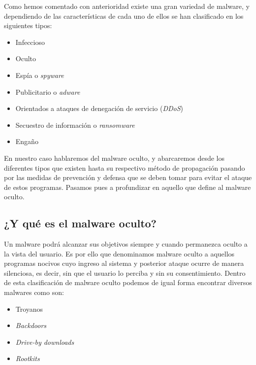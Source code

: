 \documentclass[12pt]{article}
\newcommand{\newpar} {
    \vskip 0.5cm
}
\begin{document}
        \newpar

        Como hemos comentado con anterioridad existe una gran variedad de malware, y dependiendo de las características de cada uno de ellos se han clasificado en los siguientes tipos:
        
        \begin{itemize}
            \item Infeccioso
            \item Oculto
            \item Espía o \textit{spyware}
            \item Publicitario o \textit{adware}
            \item Orientados a ataques de denegación de servicio (\textit{DDoS})
            \item Secuestro de información o \textit{ransomware}
            \item Engaño 
        \end{itemize}

        \newpar

        En nuestro caso hablaremos del malware oculto, y abarcaremos desde los diferentes tipos que existen hasta su respectivo método de propagación pasando por las medidas de prevención y defensa que se deben tomar para evitar el ataque de estos programas. Pasamos pues a profundizar en aquello que define al malware oculto.

        \subsection{¿Y qué es el malware oculto?}
            Un malware podrá alcanzar sus objetivos siempre y cuando permanezca oculto a la vista del usuario. Es por ello que denominamos malware oculto a aquellos programas nocivos cuyo ingreso al sistema y posterior ataque ocurre de manera silenciosa, es decir, sin que el usuario lo perciba y sin su consentimiento. Dentro de esta clasificación de malware oculto podemos de igual forma encontrar diversos malwares como son:

            \begin{itemize}
                \item Troyanos
                \item \textit{Backdoors}
                \item \textit{Drive-by downloads}
                \item \textit{Rootkits}
            \end{itemize}
\end{document}
